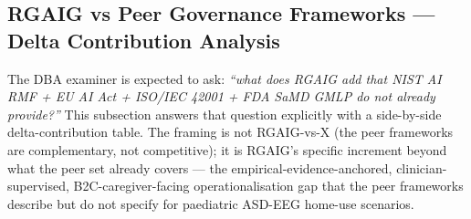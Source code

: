 \subsection{RGAIG vs Peer Governance Frameworks --- Delta Contribution Analysis}
\label{subsec:rgaig_vs_peer_frameworks}

\noindent The DBA examiner is expected to ask: \emph{``what does RGAIG add that NIST AI RMF + EU AI Act + ISO/IEC 42001 + FDA SaMD GMLP do not already provide?''} This subsection answers that question explicitly with a side-by-side delta-contribution table. The framing is not RGAIG-vs-X (the peer frameworks are complementary, not competitive); it is RGAIG's specific increment beyond what the peer set already covers --- the empirical-evidence-anchored, clinician-supervised, B2C-caregiver-facing operationalisation gap that the peer frameworks describe but do not specify for paediatric ASD-EEG home-use scenarios.

